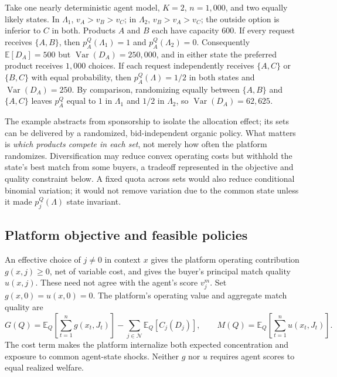 \documentclass[opre,dblanonrev]{informs4}
\providecommand{\E}{\mathbb{E}}
\providecommand{\1}{\mathbf{1}}
\providecommand{\Var}{\operatorname{Var}}
\begin{document}
\begin{example}\label{ex:diversify}
Take one nearly deterministic agent model, $K=2$, $n=1{,}000$, and two equally likely states. In $\Lambda_1$, $v_A>v_B>v_C$; in $\Lambda_2$, $v_B>v_A>v_C$; the outside option is inferior to $C$ in both. Products $A$ and $B$ each have capacity $600$. If every request receives $\{A,B\}$, then $p_A^Q(\Lambda_1)=1$ and $p_A^Q(\Lambda_2)=0$. Consequently $\E[D_A]=500$ but $\Var(D_A)=250{,}000$, and in either state the preferred product receives $1{,}000$ choices. If each request independently receives $\{A,C\}$ or $\{B,C\}$ with equal probability, then $p_A^Q(\Lambda)=1/2$ in both states and $\Var(D_A)=250$. By comparison, randomizing equally between $\{A,B\}$ and $\{A,C\}$ leaves $p_A^Q$ equal to $1$ in $\Lambda_1$ and $1/2$ in $\Lambda_2$, so $\Var(D_A)=62{,}625$.
\end{example}

The example abstracts from sponsorship to isolate the allocation effect; its sets can be delivered by a randomized, bid-independent organic policy. What matters is \emph{which products compete in each set}, not merely how often the platform randomizes. Diversification may reduce convex operating costs but withhold the state's best match from some buyers, a tradeoff represented in the objective and quality constraint below. A fixed quota across sets would also reduce conditional binomial variation; it would not remove variation due to the common state unless it made $p_j^Q(\Lambda)$ state invariant.

\subsection{Platform objective and feasible policies}\label{sec:model-objective}

An effective choice of $j\ne0$ in context $x$ gives the platform operating contribution $g(x,j)\ge0$, net of variable cost, and gives the buyer's principal match quality $u(x,j)$. These need not agree with the agent's score $v_j^m$. Set $g(x,0)=u(x,0)=0$. The platform's operating value and aggregate match quality are
\[
G(Q)=\E_Q\!\left[\sum_{t=1}^{n}g(x_t,J_t)\right]
      -\sum_{j\in\mathcal N}\E_Q[C_j(D_j)],
\qquad
M(Q)=\E_Q\!\left[\sum_{t=1}^{n}u(x_t,J_t)\right].
\]
The cost term makes the platform internalize both expected concentration and exposure to common agent-state shocks. Neither $g$ nor $u$ requires agent scores to equal realized welfare.
\end{document}
